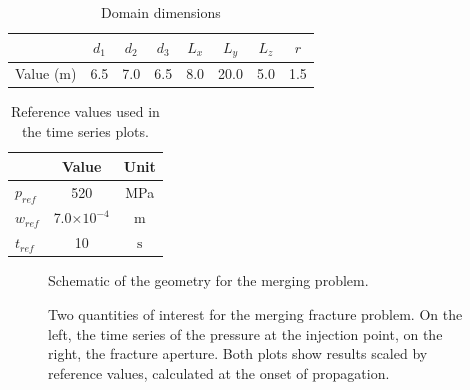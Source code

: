\begin{table}[ht]
  \centering
  \caption{Domain dimensions}
  \begin{tabular}[t]{lccccccc}
  \hline
  &$d_1$&$d_2$&$d_3$&$L_x$&$L_y$&$L_z$&$r$\\  
  \hline
  Value (m) & 6.5 & 7.0 & 6.5 & 8.0 & 20.0 & 5.0 & 1.5\\
  \hline
  \end{tabular}
  \label{merging_measures}
\end{table}%

\begin{table}[ht]
  \centering
  \caption{Reference values used in the time series plots.}
  \begin{tabular}[t]{lcc}
  \hline
  &Value &Unit \\
  \hline
  $p_{ref}$&520&MPa\\
  $w_{ref}$&7.0$\times 10^{-4}$&m\\
  $t_{ref}$&10&$\text{s}$\\
  \hline
  \end{tabular}
  \label{merging_refs}
\end{table}%

\begin{figure}[ht]
  \centering
  \caption{Schematic of the geometry for the merging problem.}
  \label{fig:merging_schematic}
\end{figure}


\begin{figure}[h]
\noindent
\hspace{0.5cm}

\caption{Two quantities of interest for the merging fracture problem. On the left, the time series of the pressure at the injection point, on the right, the fracture aperture. Both plots show results scaled by reference values, calculated at the onset of propagation.}  
\label{fig:merging_charts}
\end{figure}


